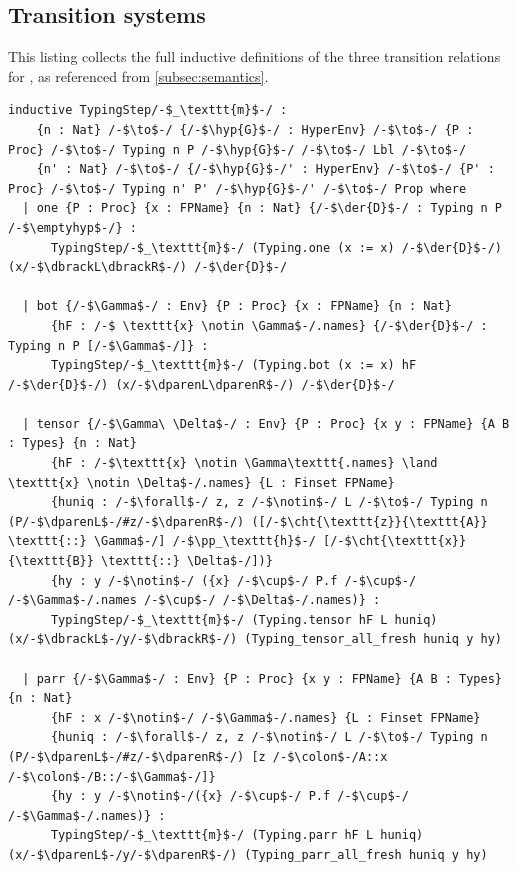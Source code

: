 \subsection{Transition systems}\label{app:transition-systems}
This listing collects the full inductive definitions of the three transition relations for \pimll{}, as referenced from 
\cref{subsec:semantics}.

\begin{lstlisting}[language=Lean4,
  caption={The typed transition relation \texttt{TypingStep}$_{\texttt{m}}$.},
  label={lst:app-typingstep}]
inductive TypingStep/-$_\texttt{m}$-/ :
    {n : Nat} /-$\to$-/ {/-$\hyp{G}$-/ : HyperEnv} /-$\to$-/ {P : Proc} /-$\to$-/ Typing n P /-$\hyp{G}$-/ /-$\to$-/ Lbl /-$\to$-/ 
    {n' : Nat} /-$\to$-/ {/-$\hyp{G}$-/' : HyperEnv} /-$\to$-/ {P' : Proc} /-$\to$-/ Typing n' P' /-$\hyp{G}$-/' /-$\to$-/ Prop where
  | one {P : Proc} {x : FPName} {n : Nat} {/-$\der{D}$-/ : Typing n P /-$\emptyhyp$-/} :
      TypingStep/-$_\texttt{m}$-/ (Typing.one (x := x) /-$\der{D}$-/) (x/-$\dbrackL\dbrackR$-/) /-$\der{D}$-/
      
  | bot {/-$\Gamma$-/ : Env} {P : Proc} {x : FPName} {n : Nat}
      {hF : /-$ \texttt{x} \notin \Gamma$-/.names} {/-$\der{D}$-/ : Typing n P [/-$\Gamma$-/]} :
      TypingStep/-$_\texttt{m}$-/ (Typing.bot (x := x) hF /-$\der{D}$-/) (x/-$\dparenL\dparenR$-/) /-$\der{D}$-/

  | tensor {/-$\Gamma\ \Delta$-/ : Env} {P : Proc} {x y : FPName} {A B : Types} {n : Nat}
      {hF : /-$\texttt{x} \notin \Gamma\texttt{.names} \land \texttt{x} \notin \Delta$-/.names} {L : Finset FPName}
      {huniq : /-$\forall$-/ z, z /-$\notin$-/ L /-$\to$-/ Typing n (P/-$\dparenL$-/#z/-$\dparenR$-/) ([/-$\cht{\texttt{z}}{\texttt{A}} \texttt{::} \Gamma$-/] /-$\pp_\texttt{h}$-/ [/-$\cht{\texttt{x}}{\texttt{B}} \texttt{::} \Delta$-/])}
      {hy : y /-$\notin$-/ ({x} /-$\cup$-/ P.f /-$\cup$-/ /-$\Gamma$-/.names /-$\cup$-/ /-$\Delta$-/.names)} :
      TypingStep/-$_\texttt{m}$-/ (Typing.tensor hF L huniq) (x/-$\dbrackL$-/y/-$\dbrackR$-/) (Typing_tensor_all_fresh huniq y hy)

  | parr {/-$\Gamma$-/ : Env} {P : Proc} {x y : FPName} {A B : Types} {n : Nat}
      {hF : x /-$\notin$-/ /-$\Gamma$-/.names} {L : Finset FPName}
      {huniq : /-$\forall$-/ z, z /-$\notin$-/ L /-$\to$-/ Typing n (P/-$\dparenL$-/#z/-$\dparenR$-/) [z /-$\colon$-/A::x /-$\colon$-/B::/-$\Gamma$-/]}
      {hy : y /-$\notin$-/({x} /-$\cup$-/ P.f /-$\cup$-/ /-$\Gamma$-/.names)} :
      TypingStep/-$_\texttt{m}$-/ (Typing.parr hF L huniq) (x/-$\dparenL$-/y/-$\dparenR$-/) (Typing_parr_all_fresh huniq y hy)


\end{lstlisting}
